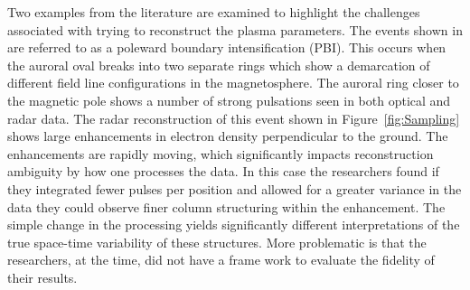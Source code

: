Two examples from the literature are examined to highlight the challenges associated with trying to reconstruct the plasma parameters.
The events shown in \cite{Semeter:2005fo} are referred to as a poleward boundary intensification (PBI). This occurs when the auroral oval breaks into two separate rings which show a demarcation of different field line configurations in the magnetosphere. The auroral ring closer to the magnetic pole shows a number of strong pulsations seen in both optical and radar data. The radar reconstruction of this event shown in Figure~\ref{fig:Sampling} shows large enhancements in electron density perpendicular to the ground. The enhancements are rapidly moving, which significantly impacts reconstruction ambiguity by how one processes the data. In this case the researchers found if they integrated fewer pulses per position and allowed for a greater variance in the data they could observe finer column structuring within the enhancement. The simple change in the processing yields significantly different interpretations of the true space-time variability of these structures. More problematic is that the researchers, at the time, did not have a frame work to evaluate the fidelity of their results.
%
%


